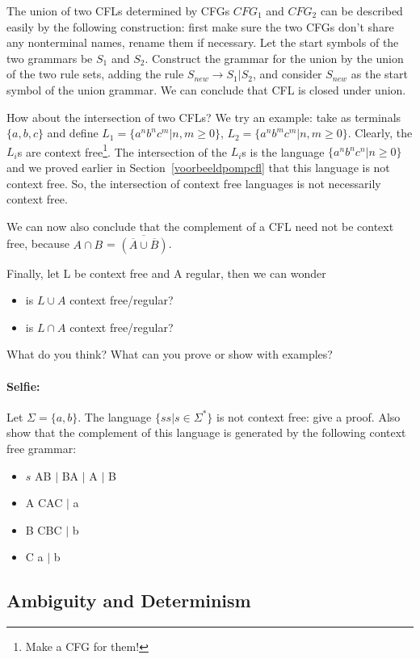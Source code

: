 The union of two CFLs determined by CFGs $CFG_1$ and $CFG_2$ can be
described easily by the following construction: first make sure the two CFGs don't share any nonterminal names, rename them if necessary. Let the start symbols of the two
grammars be $S_1$ and $S_2$. Construct the grammar for the union by
the union of the two rule sets, adding the rule $S_{new} \rightarrow
S_1 | S_2$, and consider $S_{new}$ as the start symbol of the union
grammar. We can conclude that CFL is closed under union.

How about the intersection of two CFLs? We try an example: take as
terminals $\{a,b,c\}$ and define $L_1 = \{a^nb^nc^m|n,m \geq 0\}$,
$L_2 = \{a^nb^mc^m|n,m \geq 0\}$. Clearly, the $L_i$s are context
free\footnote{Make a CFG for them!}. The intersection of the $L_i$s is
the language $\{a^nb^nc^n|n \geq 0\}$ and we proved earlier in
Section~\ref{voorbeeldpompcfl} that this language is not context
free. So, the intersection of context free languages is not
necessarily context free.

We can now also conclude that the complement of a CFL need not be
context free, because
%
$A \cap B$ = $\overline{(\overline{A} \cup \overline{B})}$.

Finally, let L be context free and A regular, then we can wonder

\begin{itemize}
\item is $L \cup A$ context free/regular?
\item is $L \cap A$ context free/regular?
\end{itemize}

What do you think? What can you prove or show with examples?

\paragraph{Selfie:} Let $\Sigma = \{a,b\}$.
The language $\{ss|s \in \Sigma^*\}$ is not context free: give a
proof. Also show that the \label{zelfdoen1} complement of this
language is generated by the following context free grammar:
\begin{itemize}
\item $s$ \rpijl AB $|$ BA $|$ A $|$ B
\item A \rpijl CAC $|$ a
\item B \rpijl CBC $|$ b
\item C \rpijl a $|$ b
\end{itemize}


\subsection{Ambiguity and Determinism}


